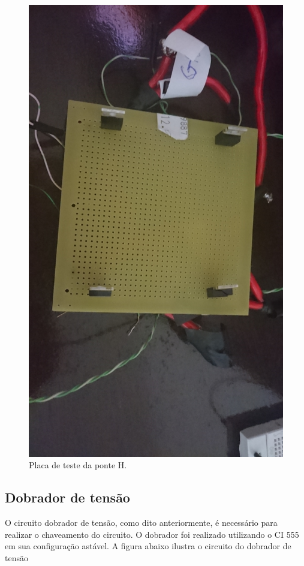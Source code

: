 \begin{figure}[h!]
  \centering
  \includegraphics[scale=0.075]{figuras/TestePonteH.JPG}
  \caption{Placa de teste da ponte H.}
\end{figure}

\subsection{Dobrador de tensão}

O circuito dobrador de tensão, como dito anteriormente, é necessário para
realizar o chaveamento do circuito. O dobrador foi realizado utilizando o CI
555 em sua configuração astável. A figura abaixo ilustra o circuito do dobrador de tensão

